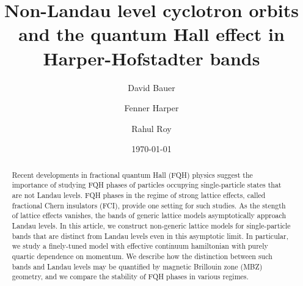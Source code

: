 \documentclass[aps,prb,twocolumn,letterpaper,twoside,nobalancelastpage,groupedaddress,amsmath,amssymb,floatfix,citeautoscript]{revtex4-1}
\begin{document}
\def \Ns {\mathbb{N}}
\def \Rs {\mathbb{R}}
\def \Zs {\mathbb{Z}}
\def \Qs {\mathbb{Q}}
\def \Cs {\mathbb{C}}
\def \id {\mathbb{I}}

\def \bfq {{\bf q}}
\def \bfp {{\bf p}}
\def \bfx {{\bf x}}
\def \bfy {{\bf y}}
\def \bfz {{\bf z}}
\def \bfr {{\bf r}}
\def \bfk {{\bf k}}
\def \bfn {{\bf n}}
\def \bfb {{\bf b}}
\def \bfm {\mathbf{m}}
\def \bfn {\mathbf{n}}


\def \hatq {\widehat{q}}
\def \hatp {\widehat{p}}
\def \hata {\widehat{a}}
\def \hatadag {\widehat{a}^{\dagger}}
\def \wtN {\widetilde{N}}

\def \ve {\varepsilon}
\def \vth {\vartheta}



\title{Non-Landau level cyclotron orbits and the quantum Hall effect in Harper-Hofstadter bands}
\author{David Bauer}

\author{Fenner Harper}

\author{Rahul Roy}

\date{\today}
\begin{abstract}
Recent developments in fractional quantum Hall (FQH) physics suggest the importance of studying FQH phases of particles occupying single-particle states that are not Landau levels. FQH phases in the regime of strong lattice effects, called fractional Chern insulators (FCI), provide one setting for such studies. As the stength of lattice effects vanishes, the bands of generic lattice models asymptotically approach Landau levels. In this article, we construct non-generic lattice models for single-particle bands that are distinct from Landau levels even in this asymptotic limit. In particular, we study a finely-tuned model with effective continuum hamiltonian with purely quartic dependence on momentum. We describe how the distinction between such bands and Landau levels may be quantified by magnetic Brillouin zone (MBZ) geometry, and we compare the stability of FQH phases in various regimes.
\end{abstract}
\end{document}
